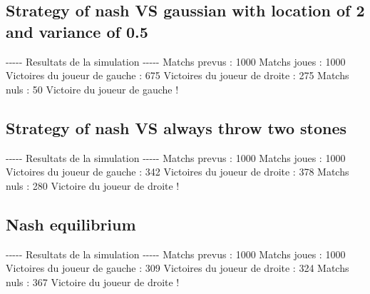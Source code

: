 \documentclass{article}%
\begin{document}
%
\subsection{Strategy of nash VS gaussian with location of 2 and variance of 0.5}%
\label{subsec:Strategy of nash VS gaussian with location of 2 and variance of 0.5}%
{-}{-}{-}{-}{-} Resultats de la simulation {-}{-}{-}{-}{-}\newline%
		\newline%
Matchs prevus : 1000\newline%
Matchs joues : 1000\newline%
\newline%
Victoires du joueur de gauche : 675\newline%
Victoires du joueur de droite : 275\newline%
Matchs nuls : 50\newline%
\newline%
Victoire du joueur de gauche !

%
\subsection{Strategy of nash VS always throw two stones}%
\label{subsec:Strategy of nash VS always throw two stones}%
{-}{-}{-}{-}{-} Resultats de la simulation {-}{-}{-}{-}{-}\newline%
		\newline%
Matchs prevus : 1000\newline%
Matchs joues : 1000\newline%
\newline%
Victoires du joueur de gauche : 342\newline%
Victoires du joueur de droite : 378\newline%
Matchs nuls : 280\newline%
\newline%
Victoire du joueur de droite !

%
\subsection{Nash equilibrium}%
\label{subsec:Nash equilibrium}%
{-}{-}{-}{-}{-} Resultats de la simulation {-}{-}{-}{-}{-}\newline%
		\newline%
Matchs prevus : 1000\newline%
Matchs joues : 1000\newline%
\newline%
Victoires du joueur de gauche : 309\newline%
Victoires du joueur de droite : 324\newline%
Matchs nuls : 367\newline%
\newline%
Victoire du joueur de droite !
\end{document}
